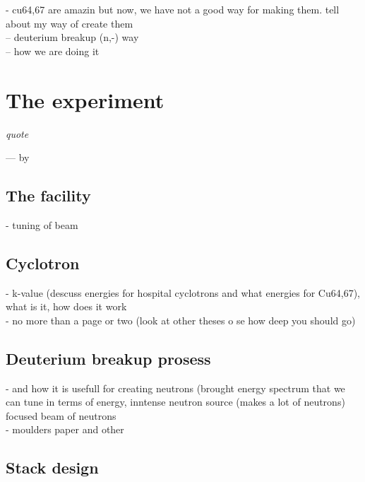 \documentclass[twoside,english]{uiofysmaster/uiofysmaster}
\begin{document}
- cu64,67 are amazin but now, we have not a good way for making them. tell about my way of create them\\
-- deuterium breakup (n,-) way\\
-- how we are doing it\\




\chapter{The experiment}
\label{ch: experiment}

\epigraph{\itshape quote}{--- \textup{by}}



\section{The facility}
\label{sec: facility}

- tuning of beam

\section{Cyclotron}
\label{sec: cyclotron}

- k-value (descuss energies for hospital cyclotrons and what energies for Cu64,67), what is it, how does it work\\
- no more than a page or two (look at other theses o se how deep you should go)

\section{Deuterium breakup prosess}
\label{sec: D_breakup}

- and how it is usefull for creating neutrons (brought energy spectrum that we can tune in terms of energy, inntense neutron source (makes a lot of neutrons) focused beam of neutrons \\
- moulders paper and other



\section{Stack design}
\label{sec: stack_design}
\end{document}
